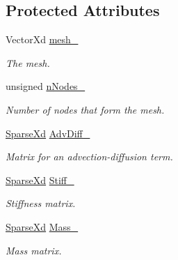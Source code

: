 \subsection*{Protected Attributes}
\begin{DoxyCompactItemize}
\item 
\hypertarget{classPdeSolver1D_ac0185cf9f8cdf64273950a48d63df3f7}{Vector\-Xd \hyperlink{classPdeSolver1D_ac0185cf9f8cdf64273950a48d63df3f7}{mesh\-\_\-}}\label{classPdeSolver1D_ac0185cf9f8cdf64273950a48d63df3f7}

\begin{DoxyCompactList}\small\item\em The mesh. \end{DoxyCompactList}\item 
\hypertarget{classPdeSolver1D_a8f4bb43717322579edc12974700aec98}{unsigned \hyperlink{classPdeSolver1D_a8f4bb43717322579edc12974700aec98}{n\-Nodes\-\_\-}}\label{classPdeSolver1D_a8f4bb43717322579edc12974700aec98}

\begin{DoxyCompactList}\small\item\em Number of nodes that form the mesh. \end{DoxyCompactList}\item 
\hypertarget{classPdeSolver1D_a2febd884c8758db9fd346a40d81671eb}{\hyperlink{typedefs_8h_a86edf437f454f4dd79d5422366403b7f}{Sparse\-Xd} \hyperlink{classPdeSolver1D_a2febd884c8758db9fd346a40d81671eb}{Adv\-Diff\-\_\-}}\label{classPdeSolver1D_a2febd884c8758db9fd346a40d81671eb}

\begin{DoxyCompactList}\small\item\em Matrix for an advection-\/diffusion term. \end{DoxyCompactList}\item 
\hypertarget{classPdeSolver1D_a63de5de1757c8bc5cd0941030f9794e3}{\hyperlink{typedefs_8h_a86edf437f454f4dd79d5422366403b7f}{Sparse\-Xd} \hyperlink{classPdeSolver1D_a63de5de1757c8bc5cd0941030f9794e3}{Stiff\-\_\-}}\label{classPdeSolver1D_a63de5de1757c8bc5cd0941030f9794e3}

\begin{DoxyCompactList}\small\item\em Stiffness matrix. \end{DoxyCompactList}\item 
\hypertarget{classPdeSolver1D_aa0e70aa868721f4bbf1fe7ec57e097a9}{\hyperlink{typedefs_8h_a86edf437f454f4dd79d5422366403b7f}{Sparse\-Xd} \hyperlink{classPdeSolver1D_aa0e70aa868721f4bbf1fe7ec57e097a9}{Mass\-\_\-}}\label{classPdeSolver1D_aa0e70aa868721f4bbf1fe7ec57e097a9}

\begin{DoxyCompactList}\small\item\em Mass matrix. \end{DoxyCompactList}\end{DoxyCompactItemize}
